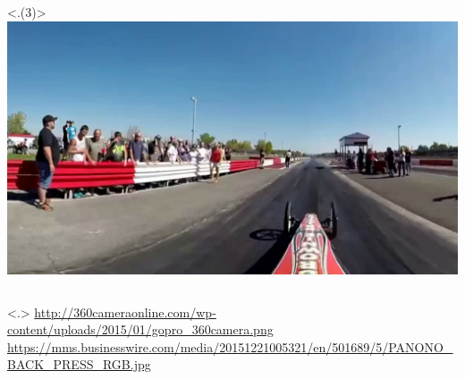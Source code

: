 \begin{frame}[c]
\begin{minipage}[t][7cm][t]{\textwidth}
{\begin{columns}[T]
\begin{column}{0.5\linewidth}
               \only<.(3)>{\hspace{2cm}\includegraphics[scale=0.065]{videos/fov2.png}}
            \end{column}
         \end{columns}
         \onslide<.>{
         \vspace{-0.75cm}
         {
            \tiny
            \url{http://360cameraonline.com/wp-content/uploads/2015/01/gopro_360camera.png}
         }\\

         {\vspace{-0.75cm}
            \tiny \url{https://mms.businesswire.com/media/20151221005321/en/501689/5/PANONO_BACK_PRESS_RGB.jpg}
         }
         }
      }
    \end{minipage}
    \vfill
\end{frame}

